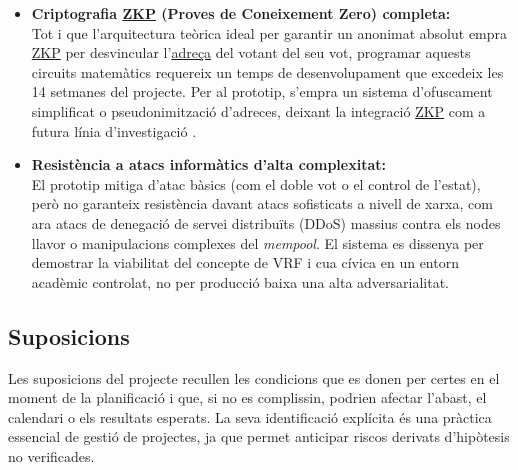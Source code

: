 \begin{itemize}
    \item \textbf{Criptografia \hyperlink{def:zkp}{ZKP} (Proves de Coneixement Zero) completa:} \\
    Tot i que l'arquitectura teòrica ideal per garantir un anonimat absolut empra \hyperlink{def:zkp}{ZKP} per desvincular l'\hyperlink{def:adreca}{adreça} del votant del seu vot, programar aquests circuits matemàtics requereix un temps de desenvolupament que excedeix les 14 setmanes del projecte. Per al prototip, s'empra un sistema d'ofuscament simplificat o pseudonimització d'adreces, deixant la integració \hyperlink{def:zkp}{ZKP} com a futura línia d'investigació \cite{groth2010} \cite{ethereum_zkp}.
    
    \item \textbf{Resistència a atacs informàtics d'alta complexitat:} \\
    El prototip mitiga d'atac bàsics (com el doble vot o el control de l'estat), però no garanteix resistència davant atacs sofisticats a nivell de xarxa, com ara atacs de denegació de servei distribuïts (DDoS) massius contra els nodes llavor o manipulacions complexes del \textit{mempool}. El sistema es dissenya per demostrar la viabilitat del concepte de VRF i cua cívica en un entorn acadèmic controlat, no per producció baixa una alta adversarialitat.
\end{itemize}

\subsection{Suposicions}

Les suposicions del projecte recullen les condicions que es donen per certes en el
moment de la planificació i que, si no es complissin, podrien afectar l'abast, el
calendari o els resultats esperats. 
La seva identificació explícita és una pràctica
essencial de gestió de projectes, ja que permet anticipar riscos derivats d'hipòtesis
no verificades.


